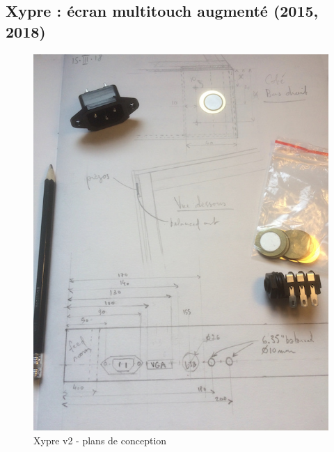 \subsection{Xypre : écran multitouch augmenté (2015, 2018)}
\begin{figure}[!htbp]
	\captionsetup{format=plain}%
	\centering
	\begin{minipage}[t]{0.365\textwidth}
		\includegraphics[width=\linewidth]{gfx/05_interfaces/Xypre_plan01_72dpi.jpg}
		\caption{Xypre v2 - plans de conception}
		\label{fig:interface:xypre_plans}
	\end{minipage}
	\hspace{.01\linewidth}
	\begin{minipage}[t]{0.6\textwidth}

\end{minipage}
\end{figure}
